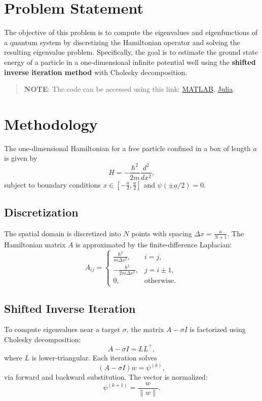 \section*{Problem Statement}
The objective of this problem is to compute the eigenvalues and eigenfunctions of a quantum system by discretizing the Hamiltonian operator and solving the resulting eigenvalue problem. Specifically, the goal is to estimate the ground state energy of a particle in a one-dimensional infinite potential well using the \textbf{shifted inverse iteration method} with Cholesky decomposition.

\begin{quote}
  \textbf{NOTE}: The code can be accessed using this link: \href{https://raw.githubusercontent.com/HavokSahil/computational-techniques-assignments/refs/heads/main/assignment2/a3.m}{MATLAB}, \href{https://raw.githubusercontent.com/HavokSahil/computational-techniques-assignments/refs/heads/main/assignment2/a3.jl}{Julia}.
\end{quote}

\section*{Methodology}
The one-dimensional Hamiltonian for a free particle confined in a box of length $a$ is given by
\[
  H = -\frac{\hbar^2}{2m} \frac{d^2}{dx^2},
\]
subject to boundary conditions $x \in \left[-\tfrac{a}{2}, \tfrac{a}{2}\right]$ and $\psi(\pm a/2) = 0$.

\subsection*{Discretization}
The spatial domain is discretized into $N$ points with spacing $\Delta x = \tfrac{a}{N+1}$. The Hamiltonian matrix $A$ is approximated by the finite-difference Laplacian:
\[
  A_{ij} =
  \begin{cases}
    \tfrac{\hbar^2}{m \Delta x^2}, & i = j, \\
    -\tfrac{\hbar^2}{2m \Delta x^2}, & j = i \pm 1, \\
    0, & \text{otherwise}.
  \end{cases}
\]

\subsection*{Shifted Inverse Iteration}
To compute eigenvalues near a target $\sigma$, the matrix $A - \sigma I$ is factorized using Cholesky decomposition:
\[
  A - \sigma I = LL^\top,
\]
where $L$ is lower-triangular. Each iteration solves
\[
  (A - \sigma I) w = \psi^{(k)},
\]
via forward and backward substitution. The vector is normalized:
\[
  \psi^{(k+1)} = \frac{w}{\|w\|}.
\]

